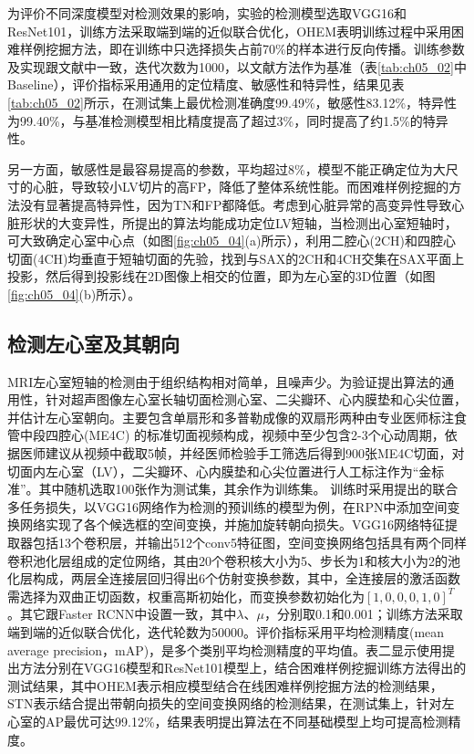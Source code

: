 为评价不同深度模型对检测效果的影响，实验的检测模型选取VGG16\citep{Simonyan2014a}和ResNet101\citep{he15}，训练方法采取端到端的近似联合优化，OHEM表明训练过程中采用困难样例挖掘方法，即在训练中只选择损失占前70\%的样本进行反向传播。训练参数及实现跟文献中一致，迭代次数为1000，以文献方法作为基准（表\ref{tab:ch05_02}中Baseline），评价指标采用通用的定位精度、敏感性和特异性，结果见表\ref{tab:ch05_02}所示，在测试集上最优检测准确度99.49\%，敏感性83.12\%，特异性为99.40\%，与基准检测模型相比精度提高了超过3\%，同时提高了约1.5\%的特异性。

另一方面，敏感性是最容易提高的参数，平均超过8\%，模型不能正确定位为大尺寸的心脏，导致较小LV切片的高FP，降低了整体系统性能。而困难样例挖掘的方法没有显著提高特异性，因为TN和FP都降低。考虑到心脏异常的高变异性导致心脏形状的大变异性，所提出的算法均能成功定位LV短轴，当检测出心室短轴时，可大致确定心室中心点（如图\ref{fig:ch05_04}(a)所示），利用二腔心(2CH)和四腔心切面(4CH)均垂直于短轴切面的先验，找到与SAX的2CH和4CH交集在SAX平面上投影，然后得到投影线在2D图像上相交的位置，即为左心室的3D位置（如图\ref{fig:ch05_04}(b)所示）。

\subsection{检测左心室及其朝向}

MRI左心室短轴的检测由于组织结构相对简单，且噪声少。为验证提出算法的通用性，针对超声图像左心室长轴切面检测心室、二尖瓣环、心内膜垫和心尖位置，并估计左心室朝向。主要包含单扇形和多普勒成像的双扇形两种由专业医师标注食管中段四腔心(ME4C) 的标准切面视频构成，视频中至少包含2-3个心动周期，依据医师建议从视频中截取5帧，并经医师检验手工筛选后得到900张ME4C切面，对切面内左心室（LV），二尖瓣环、心内膜垫和心尖位置进行人工标注作为“金标准”。其中随机选取100张作为测试集，其余作为训练集。
训练时采用提出的联合多任务损失，以VGG16网络作为检测的预训练的模型为例，在RPN中添加空间变换网络实现了各个候选框的空间变换，并施加旋转朝向损失。VGG16网络特征提取器包括13个卷积层，并输出512个conv5特征图，空间变换网络包括具有两个同样卷积池化层组成的定位网络，其由20个卷积核大小为5、步长为1和核大小为2的池化层构成，两层全连接层回归得出6个仿射变换参数，其中，全连接层的激活函数需选择为双曲正切函数，权重高斯初始化，而变换参数初始化为$[1, 0, 0, 0, 1, 0]^T$。其它跟Faster RCNN中设置一致，其中$\lambda$、$\mu$，分别取0.1和0.001；训练方法采取端到端的近似联合优化，迭代轮数为50000。评价指标采用平均检测精度(mean average precision，mAP)，是多个类别平均检测精度的平均值。表二显示使用提出方法分别在VGG16模型和ResNet101模型上，结合困难样例挖掘训练方法得出的测试结果，其中OHEM表示相应模型结合在线困难样例挖掘方法的检测结果，STN表示结合提出带朝向损失的空间变换网络的检测结果，在测试集上，针对左心室的AP最优可达99.12\%，结果表明提出算法在不同基础模型上均可提高检测精度。

